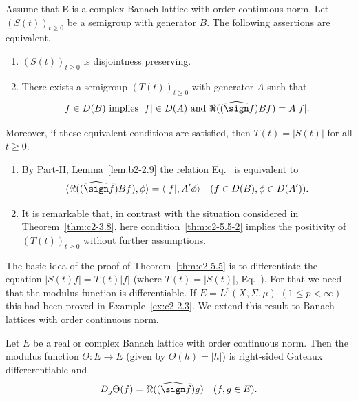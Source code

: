 \begin{theorem}\label{thm:c2-5.5}
Assume that E is a complex Banach lattice with order continuous norm. 
Let $(S(t))_{t \geq 0}$ be a semigroup with generator $B$.
The following assertions are equivalent.
\begin{enumerate}[\upshape (a)]
\item \label{thm:c2-5.5-1}
$(S(t))_{t \geq 0}$ is disjointness preserving.
\item \label{thm:c2-5.5-2}
There exists a semigroup $(T(t))_{t \geq 0}$ with generator $A$ such
that
\begin{equation}\label{eq:c2-5.5}
f \in D(B) \text{ implies } |f| \in D(A) \text{ and } \Re((\widehat{\sign}  \bar{f})Bf) = A|f|.
\end{equation}
\end{enumerate}
Moreover, if these equivalent conditions are satisfied, then
$T(t) = |S(t)|$ for all $t \geq 0$.
\end{theorem}

\begin{remark*} 
\begin{enumerate}[\upshape (i), wide, labelindent=.25em] %
\item  \label{enum:c2-kgk.1-1} %
By Part-II, Lemma~\ref{lem:b2-2.9} the relation Eq.~ is equivalent to
\[
\langle\Re(( \widehat{\sign}  \bar{f})Bf),\phi \rangle = \langle|f|,A'\phi\rangle \quad (f \in D(B), \phi \in D(A')).
\]
\item \label{enum:c2-kgk.1-2}
It is remarkable that, in contrast with the situation considered in
Theorem~\ref{thm:c2-3.8}, here condition~\ref{thm:c2-5.5-2}  implies the positivity of\/ $(T(t))_{t \geq 0}$
without further assumptions.
\end{enumerate}
\end{remark*}
The basic idea of the proof of Theorem~\ref{thm:c2-5.5}   is to differentiate the equation $|S(t)f| = T(t)|f|$ (where $T(t) = |S(t)|$, \cf Eq.~). For
that we need that the modulus function is differentiable.
If\/ $E = L^{p}(X,\Sigma,\mu)$ $(1 \leq p < \infty)$ this had been proved in Example~\ref{ex:c2-2.3}.
We extend this result to Banach lattices with order continuous norm.

\begin{proposition}\label{prop:c2-5.6}
Let $E$ be a real or complex Banach lattice with order continuous norm. 
Then the modulus function $\Theta \colon E \to E$ (given by $\Theta(h) = |h|$) is right-sided Gateaux differerentiable and
\begin{equation}\label{eq:c2-5.6}
D_{g}\Theta(f) = \Re((\widehat{\sign}  \bar{f})g) \quad (f, g \in E).
\end{equation}
\end{proposition}


